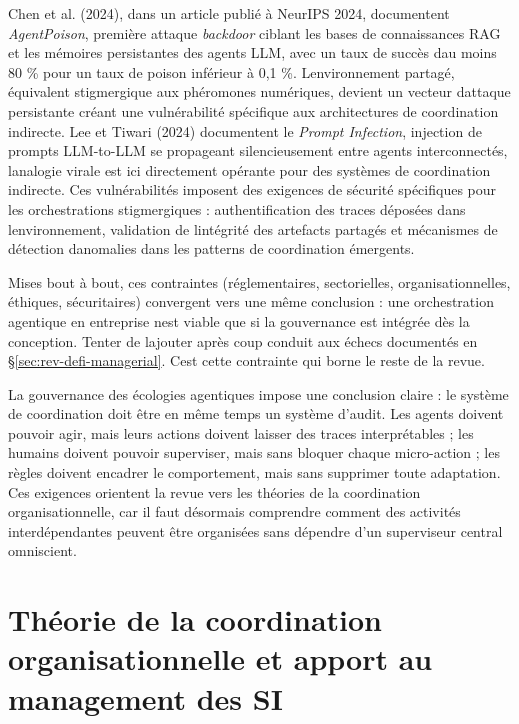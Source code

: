 Chen et al. (2024), dans un article publié à NeurIPS 2024, documentent
\emph{AgentPoison}, première attaque \emph{backdoor} ciblant les bases
de connaissances RAG et les mémoires persistantes des agents LLM, avec
un taux de succès d\textquotesingle au moins 80 \% pour un taux de
poison inférieur à 0,1 \%. L\textquotesingle environnement partagé,
équivalent stigmergique aux phéromones numériques, devient un vecteur
d\textquotesingle attaque persistante créant une vulnérabilité
spécifique aux architectures de coordination indirecte. Lee et Tiwari
(2024) documentent le \emph{Prompt Infection}, injection de prompts
LLM-to-LLM se propageant silencieusement entre agents interconnectés,
l\textquotesingle analogie virale est ici directement opérante pour des
systèmes de coordination indirecte. Ces vulnérabilités imposent des exigences de
sécurité spécifiques pour les orchestrations stigmergiques :
authentification des traces déposées dans l\textquotesingle environnement,
validation de l\textquotesingle intégrité des artefacts partagés et
mécanismes de détection d\textquotesingle anomalies dans les patterns de
coordination émergents.

Mises bout à bout, ces contraintes (réglementaires, sectorielles,
organisationnelles, éthiques, sécuritaires) convergent vers une même
conclusion : une orchestration agentique en entreprise n\textquotesingle est
viable que si la gouvernance est intégrée dès la conception. Tenter de
l\textquotesingle ajouter après coup conduit aux échecs documentés en
\S\ref{sec:rev-defi-managerial}. C\textquotesingle est cette contrainte
qui borne le reste de la revue.


La gouvernance des écologies agentiques impose une conclusion claire : le système de coordination doit être en même temps un système d'audit. Les agents doivent pouvoir agir, mais leurs actions doivent laisser des traces interprétables ; les humains doivent pouvoir superviser, mais sans bloquer chaque micro-action ; les règles doivent encadrer le comportement, mais sans supprimer toute adaptation. Ces exigences orientent la revue vers les théories de la coordination organisationnelle, car il faut désormais comprendre comment des activités interdépendantes peuvent être organisées sans dépendre d'un superviseur central omniscient.

\section{Th\'eorie de la coordination organisationnelle et apport au management des SI}\label{sec:rev-coordination-org}

